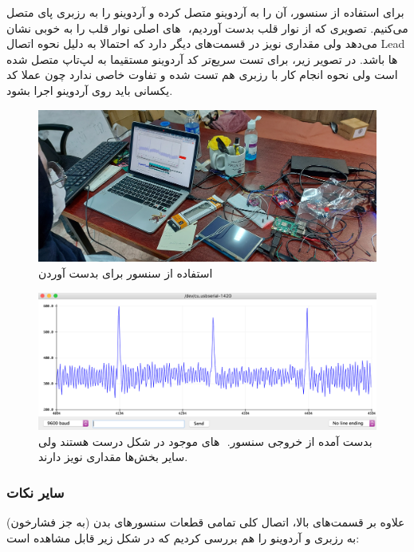 \documentclass[12pt]{article}
\begin{document}
\begin{itemize}
برای استفاده از سنسور،‌ آن را به آردوینو متصل کرده و آردوینو را به رزبری پای متصل می‌کنیم. تصویری که از نوار قلب بدست آوردیم، ‌ های اصلی نوار قلب را به خوبی نشان می‌دهد ولی مقداری نویز در قسمت‌های دیگر دارد که احتمالا به دلیل نحوه اتصال Lead ها باشد. در تصویر زیر، برای تست سریع‌تر کد آردوینو مستقیما به لپ‌تاپ متصل شده است ولی نحوه انجام کار با رزبری هم تست شده و تفاوت خاصی ندارد چون عملا کد یکسانی باید روی آردوینو اجرا بشود.


\begin{figure}[H]
	\begin{center}
		\includegraphics[width=.45\textwidth]{images/ecg-1.jpg}
	\end{center}
	\caption{استفاده از سنسور  برای بدست آوردن  }
\end{figure}



\begin{figure}[H]
	\begin{center}
		\includegraphics[width=.50\textwidth]{images/ecg-2.png}
	\end{center}
	\caption{ بدست آمده از خروجی سنسور. ‌ های موجود در شکل درست هستند ولی سایر بخش‌ها مقداری نویز دارند. }
\end{figure}

\end{itemize}

\subsubsection{سایر نکات}

علاوه بر قسمت‌های بالا، اتصال کلی تمامی قطعات سنسور‌های بدن (به جز فشارخون) به رزبری و آردوینو را هم بررسی کردیم که در شکل زیر قابل مشاهده است:
\end{document}

